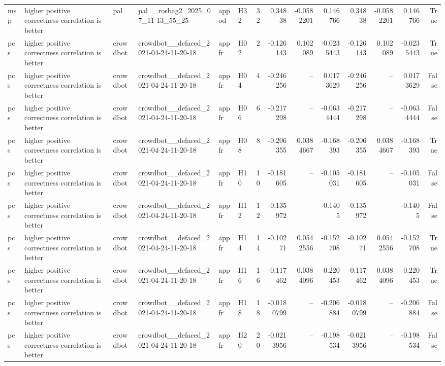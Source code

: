 \begin{longtable}{llllllrrrrrrrr}
msp & higher positive correctness correlation is better & pal & pal\_\_rosbag2\_2025\_07\_11-13\_55\_25 & appod & H32 & 32 & 0.34838 & -0.0582201 & 0.146766 & 0.34838 & -0.0582201 & 0.146766 & True \\
pcs & higher positive correctness correlation is better & crowdbot & crowdbot\_\_defaced\_2021-04-24-11-20-18 & appfr & H02 & 2 & -0.126143 & 0.102089 & -0.0235443 & -0.126143 & 0.102089 & -0.0235443 & True \\
pcs & higher positive correctness correlation is better & crowdbot & crowdbot\_\_defaced\_2021-04-24-11-20-18 & appfr & H04 & 4 & -0.246256 & -- & 0.0173629 & -0.246256 & -- & 0.0173629 & False \\
pcs & higher positive correctness correlation is better & crowdbot & crowdbot\_\_defaced\_2021-04-24-11-20-18 & appfr & H06 & 6 & -0.217298 & -- & -0.0634444 & -0.217298 & -- & -0.0634444 & False \\
pcs & higher positive correctness correlation is better & crowdbot & crowdbot\_\_defaced\_2021-04-24-11-20-18 & appfr & H08 & 8 & -0.206355 & 0.0384667 & -0.168393 & -0.206355 & 0.0384667 & -0.168393 & True \\
pcs & higher positive correctness correlation is better & crowdbot & crowdbot\_\_defaced\_2021-04-24-11-20-18 & appfr & H10 & 10 & -0.181605 & -- & -0.105031 & -0.181605 & -- & -0.105031 & False \\
pcs & higher positive correctness correlation is better & crowdbot & crowdbot\_\_defaced\_2021-04-24-11-20-18 & appfr & H12 & 12 & -0.135972 & -- & -0.1405 & -0.135972 & -- & -0.1405 & False \\
pcs & higher positive correctness correlation is better & crowdbot & crowdbot\_\_defaced\_2021-04-24-11-20-18 & appfr & H14 & 14 & -0.10271 & 0.0542556 & -0.152708 & -0.10271 & 0.0542556 & -0.152708 & True \\
pcs & higher positive correctness correlation is better & crowdbot & crowdbot\_\_defaced\_2021-04-24-11-20-18 & appfr & H16 & 16 & -0.117462 & 0.0384096 & -0.220453 & -0.117462 & 0.0384096 & -0.220453 & True \\
pcs & higher positive correctness correlation is better & crowdbot & crowdbot\_\_defaced\_2021-04-24-11-20-18 & appfr & H18 & 18 & -0.0180799 & -- & -0.206884 & -0.0180799 & -- & -0.206884 & False \\
pcs & higher positive correctness correlation is better & crowdbot & crowdbot\_\_defaced\_2021-04-24-11-20-18 & appfr & H20 & 20 & -0.0213956 & -- & -0.198534 & -0.0213956 & -- & -0.198534 & False \\

\end{longtable}
